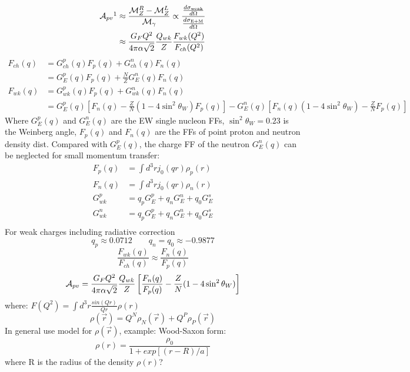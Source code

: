 \begin{equation*}
    \begin{aligned}
	\CA_{pv}\footnotemark &\approx \frac{\CM_Z^R - \CM_Z^L}{\CM_\gamma} \propto \frac{\frac{d\sigma_{\text{weak}}}{d\Omega}}{\frac{d\sigma_{\text{E+M}}}{d\Omega}}	\\
	    &\approx \frac{G_F Q^2}{4\pi\alpha\sqrt{2}} \frac{Q_{wk}}{Z}\frac{F_{wk}(Q^2)}{F_{ch}(Q^2)}
    \end{aligned}
\end{equation*}
\begin{equation*}
    \begin{aligned}
	F_{ch}(q) &= G_{ch}^p(q)F_p(q) + G_{ch}^n(q)F_n(q)  \\
		  &= G_E^p(q)F_p(q) + \frac{N}{Z}G_E^n(q)F_n(q)	\\
	F_{wk}(q) &= G_{wk}^p(q)F_p(q) + G_{wk}^n(q)F_n(q)  \\
		  &= G_E^p(q)\left[ F_n(q) - \frac{Z}{N}(1-4\sin^2\theta_W)F_p(q)\right] - G_E^n(q)\left[ F_n(q)(1-4\sin^2\theta_W) - \frac{Z}{N}F_p(q)\right]
    \end{aligned}
\end{equation*}
Where $G_E^p(q)$ and $G_E^n(q)$ are the EW single nucleon FFs, $\sin^2\theta_W = 0.23$ is the Weinberg angle, $F_p(q)$ and $F_n(q)$ are the FFs of point proton and neutron density dist. Compared with $G_E^p(q)$, the charge FF of the neutron $G_E^n(q)$ can be neglected for small momentum transfer:
\begin{equation*}
    \begin{aligned}
	F_p(q) &= \int d^3r j_0(qr) \rho_p(r)	\\
	F_n(q) &= \int d^3r j_0(qr) \rho_n(r)	\\
	G_{wk}^p &= q_p G_E^p + q_n G_E^n + q_0 G_E^s	\\
	G_{wk}^n &= q_p G_E^p + q_n G_E^n + q_0 G_E^s	\\
    \end{aligned}
\end{equation*}
For weak charges including radiative correction
$$ q_p \approx 0.0712	\qquad q_n = q_0 \approx -0.9877 $$
$$ \frac{F_{wk}(q)}{F_{ch}(q)} \approx \frac{F_n(q)}{F_p(q)}$$
$$ \mathcal{A}_{pv} = \frac{G_FQ^2}{4\pi\alpha\sqrt{2}}\frac{Q_{wk}}{Z}\left[ \frac{F_n(q)}{F_p(q)} - \frac{Z}{N}(1-4\sin^2\theta_W) \right]$$
where: $F(Q^2) = \int d^3r \frac{sin(Qr)}{Qr}\rho(r)$
\begin{equation*}
    \rho(\vec{r}) = Q^{N}\rho_N(\vec{r}) + Q^{P}\rho_P(\vec{r})
\end{equation*}
In general use model for $\rho(\vec{r})$, example: Wood-Saxon form:
\begin{equation*}
    \rho(r) = \frac{\rho_0}{1 + exp[(r-R)/a]}
\end{equation*}
where R is the radius of the density $\rho(r)$?

